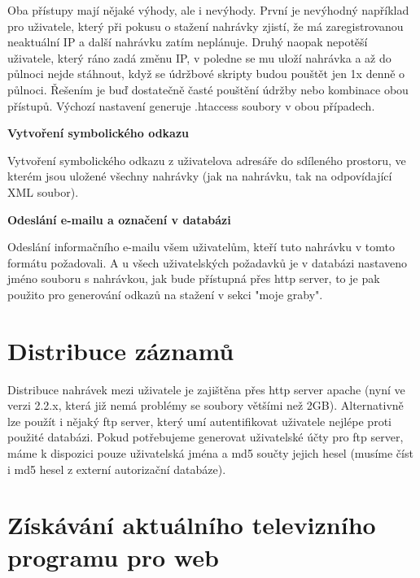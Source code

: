 \vspace{10pt}

Oba přístupy mají nějaké výhody, ale i nevýhody. První je nevýhodný například pro uživatele, který při pokusu o stažení nahrávky zjistí, že má zaregistrovanou neaktuální IP a další nahrávku zatím neplánuje. Druhý naopak nepotěší uživatele, který ráno zadá změnu IP, v poledne se mu uloží nahrávka a až do půlnoci nejde stáhnout, když se údržbové skripty budou pouštět jen 1x denně o půlnoci. Řešením je buď dostatečně časté pouštění údržby nebo kombinace obou přístupů. Výchozí nastavení generuje .htaccess soubory v obou případech.

\vspace{10pt}

\textbf{Vytvoření symbolického odkazu}

Vytvoření symbolického odkazu z uživatelova adresáře do sdíleného prostoru, ve kterém jsou uložené všechny nahrávky (jak na nahrávku, tak na odpovídající XML soubor).

\vspace{10pt}

\textbf{Odeslání e-mailu a označení v databázi}

Odeslání informačního e-mailu všem uživatelům, kteří tuto nahrávku v tomto formátu požadovali. A u všech uživatelských požadavků je v databázi nastaveno jméno souboru s nahrávkou, jak bude přístupná přes http server, to je pak použito pro generování odkazů na stažení v sekci "moje graby".

\vspace{10pt}

\section{Distribuce záznamů}

\vspace{10pt}

Distribuce nahrávek mezi uživatele je zajištěna přes http server apache (nyní ve verzi 2.2.x, která již nemá problémy se soubory většími než 2GB). Alternativně lze použít i nějaký ftp server, který umí autentifikovat uživatele nejlépe proti použité databázi. Pokud potřebujeme generovat uživatelské účty pro ftp server, máme k dispozici pouze uživatelská jména a md5 součty jejich hesel (musíme číst i md5 hesel z externí autorizační databáze).

\vspace{10pt}

\section{Získávání aktuálního televizního programu pro web}

